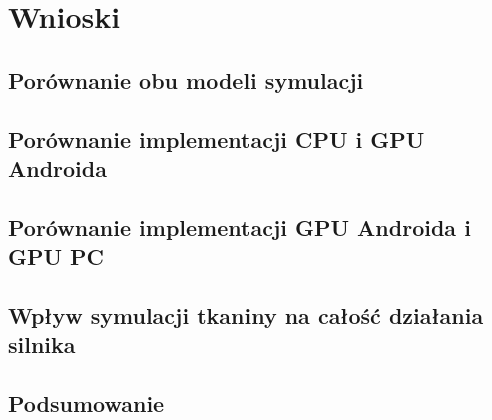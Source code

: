 \chapter{Wnioski}
\label{t:wnioski}

	\section{Porównanie obu modeli symulacji}
	\label{t:wnioski:porownanie}
	
	\section{Porównanie implementacji CPU i GPU Androida}
	\label{t:wnioski:cpu_vs_gpu}
	
	\section{Porównanie implementacji GPU Androida i GPU PC}
	\label{t:wnioski:andro_vs_pc}
	
	\section{Wpływ symulacji tkaniny na całość działania silnika}
	\label{t:wnioski:wplyw}
	
	\section{Podsumowanie}
	\label{t:wnioski:podsumowanie}

